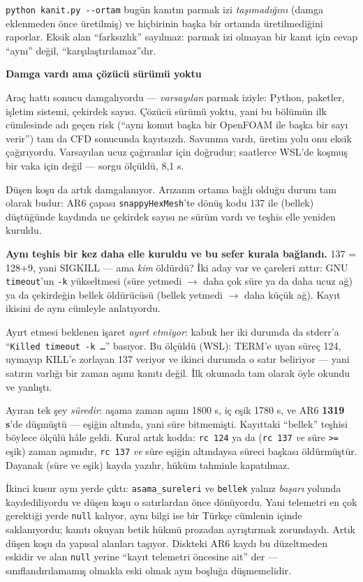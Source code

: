 \documentclass[11pt,a4paper]{article}
\newcommand{\kkkenar}{lacivert}
\newcommand{\kkzemin}{kod}
\newenvironment{renkkutu}[3]{%
  \renewcommand{\kkkenar}{#1}\renewcommand{\kkzemin}{#2}%
  \par\medskip\noindent
  \begin{lrbox}{\kutugovde}%
  \begin{minipage}{\dimexpr\linewidth-2\fboxsep-2\fboxrule\relax}\footnotesize
  \textcolor{#1}{\textbf{#3}}\par\vspace{3pt}%
}{%
  \end{minipage}%
  \end{lrbox}%
  \noindent\fcolorbox{\kkkenar}{\kkzemin}{\usebox{\kutugovde}}%
  \par\medskip
}
\newenvironment{dikkat}[1]{\begin{renkkutu}{orta}{ortabg}{#1}}{\end{renkkutu}}
\begin{document}
\texttt{python kanit.py -{}-ortam} bugün \raporKanitDamgasiz{} kanıtın parmak izi \emph{taşımadığını}
(damga eklenmeden önce üretilmiş) ve hiçbirinin başka bir ortamda üretilmediğini
raporlar. Eksik alan ``farksızlık'' sayılmaz: parmak izi olmayan bir kanıt için
cevap ``aynı'' değil, ``karşılaştırılamaz''dır.

\begin{dikkat}{Damga vardı ama çözücü sürümü yoktu}
Araç hattı sonucu damgalıyordu --- \emph{varsayılan} parmak iziyle: Python,
paketler, işletim sistemi, çekirdek sayısı. Çözücü sürümü yoktu, yani bu
bölümün ilk cümlesinde adı geçen risk (``aynı komut başka bir OpenFOAM ile
başka bir sayı verir'') tam da CFD sonucunda kayıtsızdı. Savunma vardı,
üretim yolu onu eksik çağırıyordu. Varsayılan ucuz çağıranlar için doğrudur;
saatlerce WSL'de koşmuş bir vaka için değil --- sorgu ölçüldü, 8{,}1 s.

Düşen koşu da artık damgalanıyor. Arızanın ortama bağlı olduğu durum tam
olarak budur: AR6 çapası \texttt{snappyHexMesh}'te dönüş kodu 137 ile
(bellek) düştüğünde kaydında ne çekirdek sayısı ne sürüm vardı ve teşhis
elle yeniden kuruldu.

\textbf{Aynı teşhis bir kez daha elle kuruldu ve bu sefer kurala bağlandı.}
137 = 128+9, yani SIGKILL --- ama \emph{kim} öldürdü? İki aday var ve
çareleri zıttır: GNU \texttt{timeout}'un \texttt{-k} yükseltmesi (süre
yetmedi $\to$ daha çok süre ya da daha ucuz ağ) ya da çekirdeğin bellek
öldürücüsü (bellek yetmedi $\to$ daha küçük ağ). Kayıt ikisini de aynı
cümleyle anlatıyordu.

\noindent Ayırt etmesi beklenen işaret \emph{ayırt etmiyor}: kabuk her iki
durumda da stderr'a ``\texttt{Killed timeout -k …}'' basıyor. Bu ölçüldü
(WSL): TERM'e uyan süreç 124, uymayıp KILL'e zorlayan 137 veriyor ve ikinci
durumda o satır beliriyor --- yani satırın varlığı bir zaman aşımı kanıtı
değil. İlk okumada tam olarak öyle okundu ve yanlıştı.

\noindent Ayıran tek şey \emph{süredir}: aşama zaman aşımı 1800 s, iç eşik
1780 s, ve AR6 \textbf{1319 s}'de düşmüştü --- eşiğin altında, yani süre
bitmemişti. Kayıttaki ``bellek'' teşhisi böylece ölçülü hâle geldi. Kural
artık kodda: \texttt{rc 124} ya da (\texttt{rc 137} \emph{ve} süre
\texttt{>=} eşik) zaman aşımıdır, \texttt{rc 137} \emph{ve} süre eşiğin
altındaysa süreci başkası öldürmüştür. Dayanak (süre ve eşik) kayda yazılır,
hüküm tahminle kapatılmaz.

\noindent İkinci kusur aynı yerde çıktı: \texttt{asama\_sureleri} ve
\texttt{bellek} yalnız \emph{başarı} yolunda kaydediliyordu ve düşen koşu
o satırlardan önce dönüyordu. Yani telemetri en çok gerektiği yerde
\texttt{null} kalıyor, aynı bilgi ise bir Türkçe cümlenin içinde
saklanıyordu; kanıtı okuyan betik hükmü prozadan ayrıştırmak zorundaydı.
Artık düşen koşu da yapısal alanları taşıyor. Diskteki AR6 kaydı bu
düzeltmeden eskidir ve alan \texttt{null} yerine ``kayıt telemetri
öncesine ait'' der --- sınıflandırılamamış olmakla eski olmak aynı boşluğa
düşmemelidir.


\end{dikkat}
\end{document}
